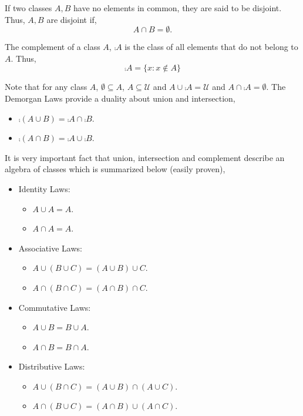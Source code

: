 \begin{Definition}
    If two classes $A,B$ have no elements in common, they are said to be disjoint. Thus, $A,B$ are
    disjoint if,
    \begin{equation*}
	A \cap B = \emptyset.
    \end{equation*}
\end{Definition}

\begin{Definition}
    The complement of a class $A$, $\comp{A}$ is the class of all elements that do not belong to $A$.
    Thus,
    \begin{equation*}
	\comp{A} =\left.\lbrace x : x \not\in A \rbrace\right.
    \end{equation*}
\end{Definition}

Note that for any class $A$, $\emptyset \subseteq A$, $A \subseteq \mathcal{U}$ and $A \cup
\comp{A} = \mathcal{U}$ and $A \cap \comp{A} = \emptyset$.
The Demorgan Laws provide a duality about union and intersection,
\begin{itemize}
    \item $\comp{(A \cup B)} = \comp{A} \cap \comp{B}$.
    \item $\comp{(A \cap B)} = \comp{A} \cup \comp{B}$.
\end{itemize}

It is very important fact that union, intersection and complement describe an algebra of classes
which is summarized below (easily proven),

\begin{itemize}
    \item Identity Laws:
	\begin{itemize}
	    \item $A \cup A = A$.
	    \item $A \cap A = A$.
	\end{itemize}
    \item Associative Laws:
	\begin{itemize}
	    \item $A \cup ( B \cup C) = (A \cup B)\cup C $.
	    \item $A \cap ( B \cap C) = (A \cap B)\cap C $.
	\end{itemize}
    \item Commutative Laws:
	\begin{itemize}
	    \item $A \cup B = B \cup A$.
	    \item $A \cap B = B \cap A$.
	\end{itemize}
    \item Distributive Laws:
	\begin{itemize}
	    \item $A \cup (B \cap C) = (A \cup B) \cap (A \cup C)$.
	    \item $A \cap (B \cup C) = (A \cap B) \cup (A \cap C)$.
	\end{itemize}
\end{itemize}


